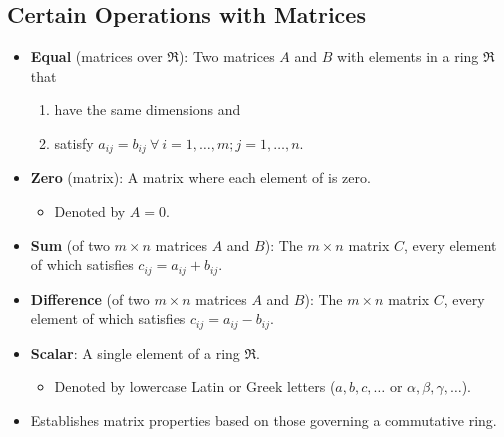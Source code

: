 \documentclass[titlepage]{article}
\numberwithin{figure}{section}
\numberwithin{equation}{section}
\begin{document}
\subsection{Certain Operations with Matrices}
\begin{itemize}
    \item \textbf{Equal} (matrices over $\mathfrak{R}$): Two matrices $A$ and $B$ with elements in a ring $\mathfrak{R}$ that
    \begin{enumerate}
        \item have the same dimensions and
        \item satisfy $a_{ij}=b_{ij}\ \forall\ i=1,\dots,m;j=1,\dots,n$.
    \end{enumerate}
    \item \textbf{Zero} (matrix): A matrix where each element of is zero.
    \begin{itemize}
        \item Denoted by $A=0$.
    \end{itemize}
    \item \textbf{Sum} (of two $m\times n$ matrices $A$ and $B$): The $m\times n$ matrix $C$, every element of which satisfies $c_{ij}=a_{ij}+b_{ij}$.
    \item \textbf{Difference} (of two $m\times n$ matrices $A$ and $B$): The $m\times n$ matrix $C$, every element of which satisfies $c_{ij}=a_{ij}-b_{ij}$.
    \item \textbf{Scalar}: A single element of a ring $\mathfrak{R}$.
    \begin{itemize}
        \item Denoted by lowercase Latin or Greek letters ($a,b,c,\dots$ or $\alpha,\beta,\gamma,\dots$).
    \end{itemize}
    \item Establishes matrix properties based on those governing a commutative ring.
\end{itemize}
\end{document}
